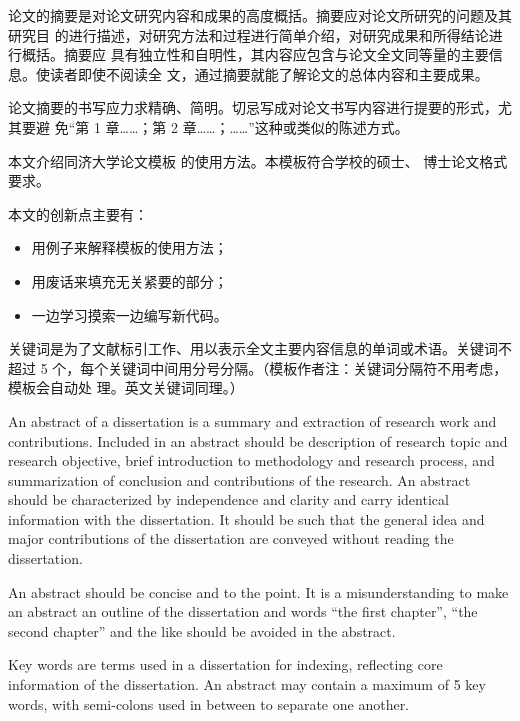 \begin{cabstract}
  论文的摘要是对论文研究内容和成果的高度概括。摘要应对论文所研究的问题及其研究目
  的进行描述，对研究方法和过程进行简单介绍，对研究成果和所得结论进行概括。摘要应
  具有独立性和自明性，其内容应包含与论文全文同等量的主要信息。使读者即使不阅读全
  文，通过摘要就能了解论文的总体内容和主要成果。

  论文摘要的书写应力求精确、简明。切忌写成对论文书写内容进行提要的形式，尤其要避
  免“第 1 章……；第 2 章……；……”这种或类似的陈述方式。

  本文介绍同济大学论文模板 \tongjithesis{} 的使用方法。本模板符合学校的硕士、
  博士论文格式要求。

  本文的创新点主要有：
  \begin{itemize}
    \item 用例子来解释模板的使用方法；
    \item 用废话来填充无关紧要的部分；
    \item 一边学习摸索一边编写新代码。
  \end{itemize}

  关键词是为了文献标引工作、用以表示全文主要内容信息的单词或术语。关键词不超过 5
  个，每个关键词中间用分号分隔。（模板作者注：关键词分隔符不用考虑，模板会自动处
  理。英文关键词同理。）
\end{cabstract}


\begin{eabstract}
   An abstract of a dissertation is a summary and extraction of research work
   and contributions. Included in an abstract should be description of research
   topic and research objective, brief introduction to methodology and research
   process, and summarization of conclusion and contributions of the
   research. An abstract should be characterized by independence and clarity and
   carry identical information with the dissertation. It should be such that the
   general idea and major contributions of the dissertation are conveyed without
   reading the dissertation.

   An abstract should be concise and to the point. It is a misunderstanding to
   make an abstract an outline of the dissertation and words ``the first
   chapter'', ``the second chapter'' and the like should be avoided in the
   abstract.

   Key words are terms used in a dissertation for indexing, reflecting core
   information of the dissertation. An abstract may contain a maximum of 5 key
   words, with semi-colons used in between to separate one another.
\end{eabstract}

